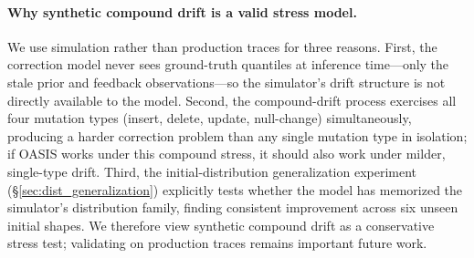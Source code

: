 \documentclass[runningheads]{llncs}
\begin{document}
\paragraph{Why synthetic compound drift is a valid stress model.}
We use simulation rather than production traces for three reasons. First, the correction model never sees ground-truth quantiles at inference time---only the stale prior and feedback observations---so the simulator's drift structure is not directly available to the model. Second, the compound-drift process exercises all four mutation types (insert, delete, update, null-change) simultaneously, producing a harder correction problem than any single mutation type in isolation; if OASIS works under this compound stress, it should also work under milder, single-type drift. Third, the initial-distribution generalization experiment (\S\ref{sec:dist_generalization}) explicitly tests whether the model has memorized the simulator's distribution family, finding consistent improvement across six unseen initial shapes. We therefore view synthetic compound drift as a conservative stress test; validating on production traces remains important future work.
\end{document}
